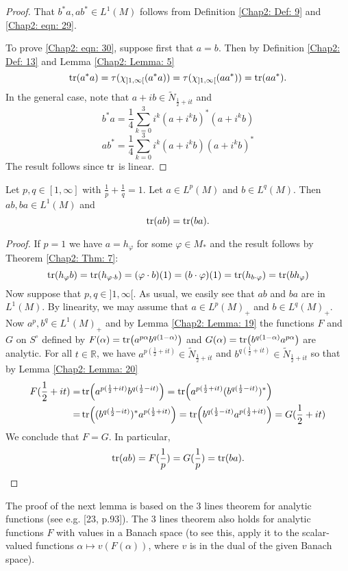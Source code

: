 \begin{proof}
    That $b^*a, ab^*\in L^1(M)$ follows from Definition \ref{Chap2: Def: 9} and \eqref{Chap2: eqn: 29}.\par
To prove \eqref{Chap2: eqn: 30}, suppose first that $a=b$. Then by Definition \ref{Chap2: Def: 13} and Lemma \ref{Chap2: Lemma: 5}
\[
    \tr(a^*a)=\tau(\chi_{]1,\infty[}(a^*a))=\tau(\chi_{]1,\infty[}(aa^*))=\tr(aa^*).
\]
In the general case, note that $a+ib\in \tilde{N}_{\frac{1}{2}+it}$ and 
\[
    b^*a=\frac{1}{4}\sum_{k=0}^3 i^k(a+i^kb)^*(a+i^kb)
\]
\[
    ab^*=\frac{1}{4}\sum_{k=0}^3 i^k(a+i^kb)(a+i^kb)^*
\]
The result follows since $\tr$ is linear.
\end{proof}
\begin{proposition}
Let $p,q\in [1,\infty]$ with $\frac{1}{p}+\frac{1}{q}=1$. Let $a\in L^p(M)$ and $b\in L^q(M)$. Then $ab,ba\in L^1(M)$ and 
\[
    \tr(ab) = \tr(ba).
\]
\end{proposition}
\begin{proof}
    If $p=1$ we have $a=h_\varphi$ for some $\varphi\in M_*$ and the result follows by Theorem \ref{Chap2: Thm: 7}:
    \[
        \tr(h_\varphi b)=\tr(h_{\varphi\cdot b})=(\varphi\cdot b)(1)=(b\cdot \varphi)(1)=\tr(h_{b\cdot\varphi})=\tr(bh_\varphi)
    \] 
    Now suppose that $p,q\in ]1,\infty[$. As usual, we easily see that $ab$ and $ba$ are in $L^1(M)$. By linearity, we may assume that $a\in L^p(M)_+$ and $b\in L^q(M)_+$. Now $a^p,b^q\in L^1(M)_+$ and by Lemma \ref{Chap2: Lemma: 19} the functions $F$ and $G$ on $S^\circ$ defined by $F(\alpha)=\tr(a^{p\alpha}b^{q(1-\alpha)})$ and $G(\alpha)=\tr(b^{q(1-\alpha)}a^{p\alpha})$ are analytic. For all $t\in \mathbb{R}$, we have $a^{p(\frac{1}{2}+it)}\in\tilde{N}_{\frac{1}{2}+it}$ and $b^{q(\frac{1}{2}+it)}\in \tilde{N}_{\frac{1}{2}+it}$ so that by Lemma \ref{Chap2: Lemma: 20}
    \[
        \begin{split}
            F(\frac{1}{2}+it)=&\tr(a^{p(\frac{1}{2}+it)}b^{q(\frac{1}{2}-it)})=\tr(a^{p(\frac{1}{2}+it)}(b^{q(\frac{1}{2}-it)})^*)\\
            =&\tr((b^{q(\frac{1}{2}-it)})^*a^{p(\frac{1}{2}+it)})=\tr(b^{q(\frac{1}{2}-it)}a^{p(\frac{1}{2}+it)})=G(\frac{1}{2}+it)
        \end{split}
    \] 
We conclude that $F=G$. In particular,
\[
    \tr(ab)=F(\frac{1}{p})=G(\frac{1}{p})=\tr(ba).
\]
\end{proof}
The proof of the next lemma is based on the 3 lines theorem for analytic functions (see e.g. [23, p.93]). The 3 lines theorem also holds for analytic functions $F$ with values in a Banach space (to see this, apply it to the scalar-valued functions $\alpha\mapsto v(F(\alpha))$, where $v$ is in the dual of the given Banach space).
